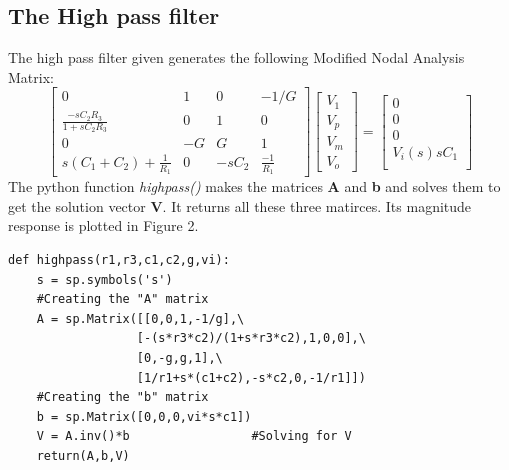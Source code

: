 \documentclass[11pt, a4paper]{article}
\begin{document}
\subsection{The High pass filter}
    The high pass filter given generates the following Modified Nodal Analysis Matrix:
    \[
    \begin{bmatrix}
        0   & 1 & 0  & -1/G \\
        \frac{-sC_2R_3}{1+sC_2R_3}  & 0 & 1 & 0\\
        0  & -G & G & 1 \\
        s(C_1+C_2) + \frac{1}{R_1}  & 0 & -sC_2 & \frac{-1}{R_1}
    \end{bmatrix}
    \begin{bmatrix}
        V_1\\
        V_p\\
        V_m \\
        V_o
    \end{bmatrix}
    =
    \begin{bmatrix}
        0 \\
        0 \\
        0 \\
        V_i(s)sC_1 \\
        
    \end{bmatrix}
    \]
    The python function \textit{highpass()} makes the matrices \textbf{A} and \textbf{b} and solves them to get the solution vector \textbf{V}. It returns all these three matirces. Its magnitude response is plotted in Figure 2.
    \begin{verbatim}
def highpass(r1,r3,c1,c2,g,vi):
    s = sp.symbols('s')
    #Creating the "A" matrix
    A = sp.Matrix([[0,0,1,-1/g],\
                  [-(s*r3*c2)/(1+s*r3*c2),1,0,0],\
                  [0,-g,g,1],\
                  [1/r1+s*(c1+c2),-s*c2,0,-1/r1]])
    #Creating the "b" matrix
    b = sp.Matrix([0,0,0,vi*s*c1])
    V = A.inv()*b                 #Solving for V
    return(A,b,V)
    \end{verbatim}
\end{document}
